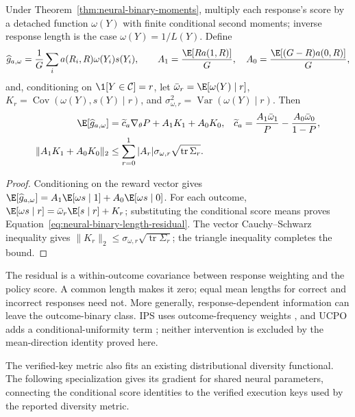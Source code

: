 \begin{proposition}
\enforcehalffinalproseline
\label{prop:neural-binary-length-residual}
Under Theorem~\ref{thm:neural-binary-moments}, multiply each response's score
by a detached function $\omega(Y)$ with finite conditional second moments;
inverse response length is the case $\omega(Y)=1/L(Y)$. Define
\[
 \widehat g_{a,\omega}
 =\frac1G\sum_i a(R_i,R)\omega(Y_i)s(Y_i),\qquad
 A_1=\frac{\E[R a(1,R)]}{G},\quad
 A_0=\frac{\E[(G-R)a(0,R)]}{G},
\]
and, conditioning on $\1[Y\in\mathcal C]=r$, let
$\bar\omega_r=\E[\omega(Y)\mid r]$,
$K_r=\operatorname{Cov}(\omega(Y),s(Y)\mid r)$, and
$\sigma_{\omega,r}^2=\operatorname{Var}(\omega(Y)\mid r)$.
Then
\begin{align}
 \E[\widehat g_{a,\omega}]
 &=\widetilde c_a\nabla_\theta P+A_1K_1+A_0K_0,
 &\widetilde c_a&=\frac{A_1\bar\omega_1}{P}
                  -\frac{A_0\bar\omega_0}{1-P},
 \label{eq:neural-binary-length-residual}\\
 \|A_1K_1+A_0K_0\|_2
 &\le\sum_{r=0}^1|A_r|\sigma_{\omega,r}
                 \sqrt{\operatorname{tr}\Sigma_r}.
 \label{eq:neural-binary-length-bound}
\end{align}
\end{proposition}

\begin{proof}
\enforcehalffinalproseline
Conditioning on the reward vector gives
$\E[\widehat g_{a,\omega}]
=A_1\E[\omega s\mid1]+A_0\E[\omega s\mid0]$.
For each outcome, $\E[\omega s\mid r]
=\bar\omega_r\E[s\mid r]+K_r$; substituting the conditional score
means proves Equation~\eqref{eq:neural-binary-length-residual}.
The vector Cauchy--Schwarz inequality gives
$\|K_r\|_2\le\sigma_{\omega,r}\sqrt{\operatorname{tr}\Sigma_r}$;
the triangle inequality completes the bound.
\end{proof}

The residual is a within-outcome covariance between response weighting and
the policy score. A common length makes it zero; equal mean lengths for
correct and incorrect responses need not. More generally, response-dependent
information can leave the outcome-binary class. IPS uses outcome-frequency
weights \citep[Section~4.4, v1]{sinha2026expected}, and UCPO adds a
conditional-uniformity term \citep[Section~6, v1]{lochab2026ucpo}; neither
intervention is excluded by the mean-direction identity proved here.


The verified-key metric also fits an existing distributional diversity
functional. The following specialization gives its gradient for shared
neural parameters, connecting the conditional score identities to the
verified execution keys used by the reported diversity metric.

